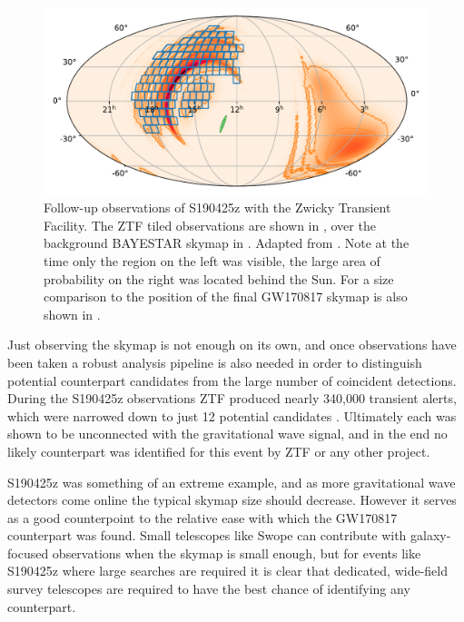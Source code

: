 \begin{colsection}
\begin{colsection}
\newpage

\begin{figure}[t]
    \begin{center}
        \includegraphics[width=\linewidth]{images/190425.pdf}
    \end{center}
    \caption[Follow-up observations of S190425z with ZTF]{
        Follow-up observations of S190425z with the Zwicky Transient Facility. The ZTF tiled observations are shown in , over the background BAYESTAR skymap in . Adapted from \citet{GW190425_ZTF}. Note at the time only the region on the left was visible, the large area of probability on the right was located behind the Sun. For a size comparison to  the position of the final GW170817 skymap is also shown in .
        }\label{fig:ztf}
\end{figure}

Just observing the skymap is not enough on its own, and once observations have been taken a robust analysis pipeline is also needed in order to distinguish potential counterpart candidates from the large number of coincident detections. During the S190425z observations ZTF produced nearly 340,000 transient alerts, which were narrowed down to just 12 potential candidates \citep{GW190425_ZTF}. Ultimately each was shown to be unconnected with the gravitational wave signal, and in the end no likely counterpart was identified for this event by ZTF or any other project.

S190425z was something of an extreme example, and as more gravitational wave detectors come online the typical skymap size should decrease. However it serves as a good counterpoint to the relative ease with which the GW170817 counterpart was found. Small telescopes like Swope can contribute with galaxy-focused observations when the skymap is small enough, but for events like S190425z where large searches are required it is clear that dedicated, wide-field survey telescopes are required to have the best chance of identifying any counterpart.

\end{colsection}


\end{colsection}

